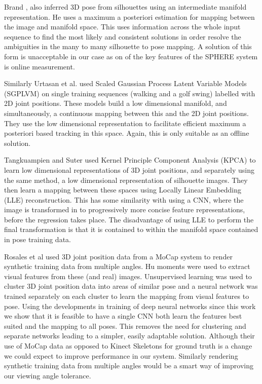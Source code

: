 \documentclass[11pt]{article} %
\begin{document}
Brand \cite{Brand1999}, also inferred 3D pose from silhouettes using an intermediate manifold representation. He uses a maximum a posteriori estimation for mapping between the image and manifold space. This uses information across the whole input sequence to find the most likely and consistent solutions in order resolve the ambiguities in the many to many silhouette to pose mapping. A solution of this form is unacceptable in our case as on of the key features of the SPHERE system is online measurement.

Similarly Urtasan et al. \cite{Urtasun2005} used Scaled Gaussian Process Latent Variable Models (SGPLVM) \cite{Lawrence2004} on single training sequences (walking and a golf swing) labelled with 2D joint positions. These models build a low dimensional manifold, and simultaneously, a continuous mapping between this and the 2D joint positions. They use the low dimensional representation to facilitate efficient maximum a posteriori based tracking in this space. Again, this is only suitable as an offline solution. 

Tangkuampien and Suter \cite{Tangkuampien2006} used Kernel Principle Component Analysis (KPCA) to learn low dimensional representations of 3D joint positions, and separately using the same method, a low dimensional representation of silhouette images. They then learn a mapping between these spaces using Locally Linear Embedding (LLE) reconstruction. This has some similarity with using a CNN, where the image is transformed in to progressively more concise feature representations, before the regression takes place. The disadvantage of using LLE to perform the final transformation is that it is contained to within the manifold space contained in pose training data. %

Rosales et al \cite{Rosales2000,Rosales2001} used 3D joint position data from a MoCap system to render synthetic training data from multiple angles. Hu moments were used to extract visual features from these (and real) images. Unsupervised learning was used to cluster 3D joint position data into areas of similar pose and a neural network was trained separately on each cluster to learn the mapping from visual features to pose. Using the developments in training of deep neural networks since this work we show that it is feasible to have a single CNN both learn the features best suited and the mapping to all poses. This removes the need for clustering and separate networks leading to a simpler, easily adaptable solution. Although their use of MoCap data as opposed to Kinect Skeletons for ground truth is a change we could expect to improve performance in our system. Similarly rendering synthetic training data from multiple angles would be a smart way of improving our viewing angle tolerance.
\end{document}
